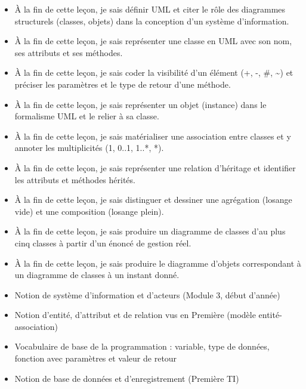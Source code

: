 \documentclass[11pt]{article}
\begin{document}
\begin{objectifs}
\begin{itemize}
\item À la fin de cette leçon, je sais définir UML et citer le rôle des diagrammes structurels (classes, objets) dans la conception d'un système d'information.
\item À la fin de cette leçon, je sais représenter une classe en UML avec son nom, ses attributs et ses méthodes.
\item À la fin de cette leçon, je sais coder la visibilité d'un élément (+, -, \#, \~{}) et préciser les paramètres et le type de retour d'une méthode.
\item À la fin de cette leçon, je sais représenter un objet (instance) dans le formalisme UML et le relier à sa classe.
\item À la fin de cette leçon, je sais matérialiser une association entre classes et y annoter les multiplicités (1, 0..1, 1..*, *).
\item À la fin de cette leçon, je sais représenter une relation d'héritage et identifier les attributs et méthodes hérités.
\item À la fin de cette leçon, je sais distinguer et dessiner une agrégation (losange vide) et une composition (losange plein).
\item À la fin de cette leçon, je sais produire un diagramme de classes d'au plus cinq classes à partir d'un énoncé de gestion réel.
\item À la fin de cette leçon, je sais produire le diagramme d'objets correspondant à un diagramme de classes à un instant donné.
\end{itemize}
\end{objectifs}

\begin{prerequis}
\begin{itemize}
\item Notion de système d'information et d'acteurs (Module 3, début d'année)
\item Notion d'entité, d'attribut et de relation vus en Première (modèle entité-association)
\item Vocabulaire de base de la programmation : variable, type de données, fonction avec paramètres et valeur de retour
\item Notion de base de données et d'enregistrement (Première TI)
\end{itemize}
\end{prerequis}
\end{document}
